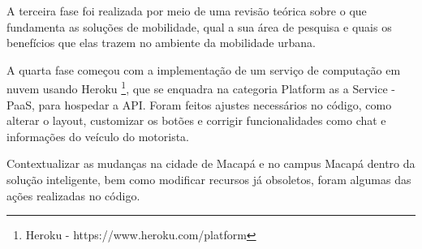 A terceira fase foi realizada por meio de uma revisão teórica sobre o que fundamenta as soluções de mobilidade, qual a sua área de pesquisa e quais os benefícios que elas trazem no ambiente da mobilidade urbana.

\begin{comment}

A metodologia foi composta de quatro fases, onde a primeira é constituída da aplicação de um questionário para analisar o interesse em relação a proposta e o perfil da comunidade acadêmica, buscando entender quais as necessidades existentes relacionadas a Mobilidade Urbana do Campus Macapá.

A segunda fase realizou-se mediante revisão teórica sobre o que fundamenta soluções de mobilidade, qual é a sua área de estudo e o que trazem de benefícios no ambiente de Mobilidade Urbana.

Na terceira fase foi realizada uma pesquisa na qual o objetivo foi encontrar soluções de Mobilidade Inteligente. Após, buscamos pela solução que apresentasse condições para que pudéssemos realizar testes e que tivesse características de serviços de caronas, transporte e compartilhamento de viagens. 
\end{comment}

A quarta fase começou com a implementação de um serviço de computação em nuvem usando Heroku \footnote{Heroku - https://www.heroku.com/platform}, que se enquadra na categoria Platform as a Service - PaaS, para hospedar a API. Foram feitos ajustes necessários no código, como alterar o layout, customizar os botões e corrigir funcionalidades como chat e informações do veículo do motorista.

Contextualizar as mudanças na cidade de Macapá e no campus Macapá dentro da solução inteligente, bem como modificar recursos já obsoletos, foram algumas das ações realizadas no código.

